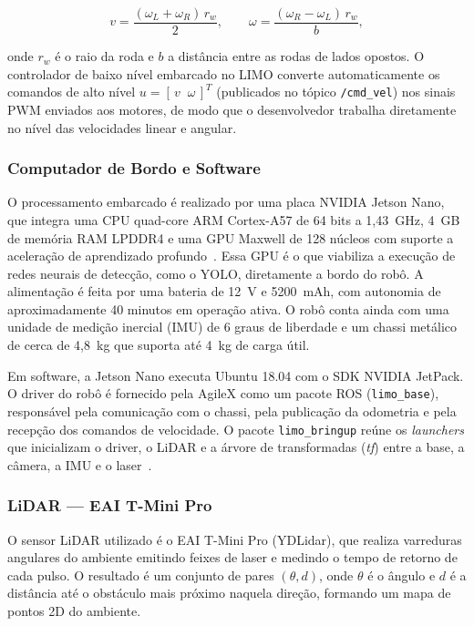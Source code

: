 \begin{equation}
  \label{eq:cinematica}
  v = \frac{(\omega_L + \omega_R)\, r_w}{2}, \qquad
  \omega = \frac{(\omega_R - \omega_L)\, r_w}{b},
\end{equation}

onde $r_w$ é o raio da roda e $b$ a distância entre as rodas de lados opostos. O
controlador de baixo nível embarcado no LIMO converte automaticamente os comandos
de alto nível $u = [\,v \;\; \omega\,]^T$ (publicados no tópico \texttt{/cmd\_vel})
nos sinais PWM enviados aos motores, de modo que o desenvolvedor trabalha
diretamente no nível das velocidades linear e angular.

\subsubsection{Computador de Bordo e Software}

O processamento embarcado é realizado por uma placa NVIDIA Jetson Nano,
que integra uma CPU quad-core ARM Cortex-A57 de 64 bits a 1,43~GHz, 4~GB de
memória RAM LPDDR4 e uma GPU Maxwell de 128 núcleos com suporte a aceleração de
aprendizado profundo~\cite{pimenta2024limo}. Essa GPU é o que viabiliza a
execução de redes neurais de detecção, como o YOLO, diretamente a bordo do robô.
A alimentação é feita por uma bateria de 12~V e 5200~mAh, com autonomia de
aproximadamente 40 minutos em operação ativa. O robô conta ainda com uma unidade
de medição inercial (IMU) de 6 graus de liberdade e um chassi metálico de cerca
de 4,8~kg que suporta até 4~kg de carga útil.

Em software, a Jetson Nano executa Ubuntu 18.04 com o SDK NVIDIA
JetPack. O driver do robô é fornecido pela AgileX como um pacote ROS
(\texttt{limo\_base}), responsável pela comunicação com o chassi, pela publicação
da odometria e pela recepção dos comandos de velocidade. O pacote
\texttt{limo\_bringup} reúne os \textit{launchers} que inicializam o driver, o
LiDAR e a árvore de transformadas (\textit{tf}) entre a base, a câmera, a IMU e o
laser~\cite{pimenta2024limo}.

\subsubsection{LiDAR — EAI T-Mini Pro}

O sensor LiDAR utilizado é o EAI T-Mini Pro (YDLidar), que realiza
varreduras angulares do ambiente emitindo feixes de laser e medindo o tempo de
retorno de cada pulso. O resultado é um conjunto de pares $(\theta, d)$, onde
$\theta$ é o ângulo e $d$ é a distância até o obstáculo mais próximo naquela
direção, formando um mapa de pontos 2D do ambiente.

